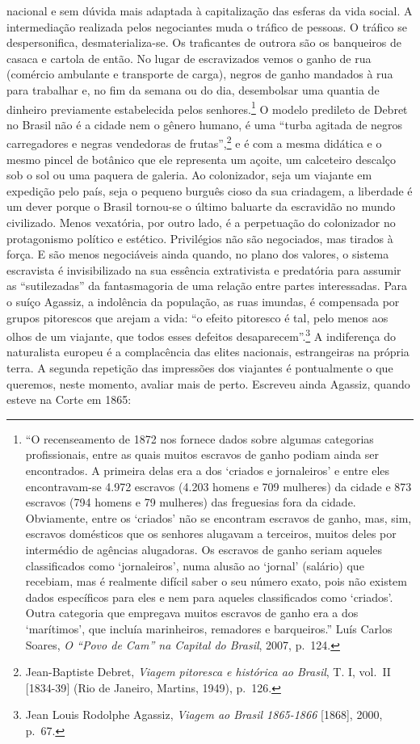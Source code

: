 nacional e sem dúvida mais adaptada à capitalização das esferas da vida
social. A intermediação realizada pelos negociantes muda o tráfico de
pessoas. O tráfico se despersonifica, desmaterializa-se. Os traficantes
de outrora são os banqueiros de casaca e cartola de então. No lugar de
escravizados vemos o ganho de rua (comércio ambulante e transporte de
carga), negros de ganho mandados à rua para trabalhar e, no fim da
semana ou do dia, desembolsar uma quantia de dinheiro previamente
estabelecida pelos senhores.\footnote{``O recenseamento de 1872 nos
  fornece dados sobre algumas categorias profissionais, entre as quais
  muitos escravos de ganho podiam ainda ser encontrados. A primeira
  delas era a dos `criados e jornaleiros' e entre eles encontravam-se
  4.972 escravos (4.203 homens e 709 mulheres) da cidade e 873 escravos
  (794 homens e 79 mulheres) das freguesias fora da cidade. Obviamente,
  entre os `criados' não se encontram escravos de ganho, mas, sim,
  escravos domésticos que os senhores alugavam a terceiros, muitos deles
  por intermédio de agências alugadoras. Os escravos de ganho seriam
  aqueles classificados como `jornaleiros', numa alusão ao `jornal'
  (salário) que recebiam, mas é realmente difícil saber o seu número
  exato, pois não existem dados específicos para eles e nem para aqueles
  classificados como `criados'. Outra categoria que empregava muitos
  escravos de ganho era a dos `marítimos', que incluía marinheiros,
  remadores e barqueiros.'' Luís Carlos Soares, \emph{O ``Povo de Cam''
  na Capital do Brasil}, 2007, p.~124.} O modelo predileto de Debret no
Brasil não é a cidade nem o gênero humano, é uma ``turba agitada de
negros carregadores e negras vendedoras de frutas'',\footnote{Jean-Baptiste
  Debret, \emph{Viagem pitoresca e histórica ao Brasil}, T. I, vol.~II
  {[}1834-39{]} (Rio de Janeiro, Martins, 1949), p.~126.} e é com a
mesma didática e o mesmo pincel de botânico que ele representa um
açoite, um calceteiro descalço sob o sol ou uma paquera de galeria. Ao
colonizador, seja um viajante em expedição pelo país, seja o pequeno
burguês cioso da sua criadagem, a liberdade é um dever porque o Brasil
tornou-se o último baluarte da escravidão no mundo civilizado. Menos
vexatória, por outro lado, é a perpetuação do colonizador no
protagonismo político e estético. Privilégios não são negociados, mas
tirados à força. E são menos negociáveis ainda quando, no plano dos
valores, o sistema escravista é invisibilizado na sua essência
extrativista e predatória para assumir as ``sutilezadas'' da
fantasmagoria de uma relação entre partes interessadas. Para o suíço
Agassiz, a indolência da população, as ruas imundas, é compensada por
grupos pitorescos que arejam a vida: ``o efeito pitoresco é tal, pelo
menos aos olhos de um viajante, que todos esses defeitos
desaparecem''.\footnote{Jean Louis Rodolphe Agassiz, \emph{Viagem ao
  Brasil 1865-1866} {[}1868{]}, 2000, p.~67.} A indiferença do
naturalista europeu é a complacência das elites nacionais, estrangeiras
na própria terra. A segunda repetição das impressões dos viajantes é
pontualmente o que queremos, neste momento, avaliar mais de perto.
Escreveu ainda Agassiz, quando esteve na Corte em 1865:


